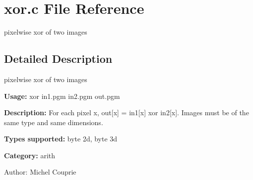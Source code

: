 \section{xor.c File Reference}
\label{xor_8c}
pixelwise xor of two images  




\label{_details}
\subsection{Detailed Description}
pixelwise xor of two images 

{\bf Usage:} xor in1.pgm in2.pgm out.pgm

{\bf Description:} For each pixel x, out[x] = in1[x] xor in2[x]. Images must be of the same type and same dimensions.

{\bf Types supported:} byte 2d, byte 3d

{\bf Category:} arith

\begin{Desc}
\item[Author:]Michel Couprie \end{Desc}
